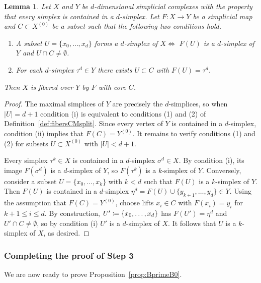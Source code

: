 \documentclass[11 pt]{article}
\theoremstyle{plain}
\newtheorem{lemma}[theorem]{Lemma}
\theoremstyle{definition}
\numberwithin{equation}{section}
\newcommand\coloneq{\mathrel{\mathop:}\mkern-1.2mu=}
\newcommand\abs[1]{\left\lvert#1\right\rvert}
\begin{document}
\begin{lemma}
\label{lemma:fibersonlyd}
Let $X$ and $Y$ be $d$-dimensional simplicial complexes with the property that every simplex is contained in a $d$-simplex. Let $F\colon X\to Y$ be a simplicial map and $C\subset X^{(0)}$ be a subset such that the following two conditions hold.
\begin{enumerate}[label={\normalfont (\roman*)}, topsep=2pt,itemsep=1pt,parsep=1pt]
\item A subset $U=\{x_0,\ldots,x_d\}$ forms a $d$-simplex of $X$\newline  $\iff$ $F(U)$ is a $d$-simplex of $Y$ and $U\cap C\neq \emptyset$.
\item For each $d$-simplex $\tau^d\in Y$ there exists $U\subset C$ with $F(U)=\tau^d$.
\end{enumerate}
Then $X$ is fibered over $Y$ by $F$ with core $C$.
\end{lemma}
\begin{proof}
The maximal simplices of $Y$ are precisely the $d$-simplices, so when $\abs{U}=d+1$ condition (i) is equivalent to conditions (1) and (2) of Definition~\ref{def:fibersCMsplit}. Since every vertex of $Y$ is contained in a $d$-simplex, condition (ii) implies that $F(C)=Y^{(0)}$. It remains to verify conditions (1) and (2) for subsets $U\subset X^{(0)}$ with $\abs{U}<d+1$.

Every simplex $\tau^k\in X$ is contained in a $d$-simplex $\sigma^d\in X$. By condition (i), its image $F(\sigma^d)$ is a $d$-simplex of $Y$, so $F(\tau^k)$ is a $k$-simplex of $Y$. Conversely, consider a subset $U=\{x_0,\ldots,x_k\}$ with $k<d$ such that $F(U)$ is a $k$-simplex of $Y$. Then $F(U)$ is contained in a $d$-simplex $\eta^d=F(U)\cup\{y_{k+1},\ldots,y_d\}\in Y$. Using the assumption that $F(C)=Y^{(0)}$, choose lifts $x_i\in C$ with $F(x_i)=y_i$ for $k+1\leq i\leq d$. By construction, $U'\coloneq\{x_0,\ldots,x_d\}$ has $F(U')=\eta^d$ and $U'\cap C\neq \emptyset$, so by condition (i) $U'$ is a $d$-simplex of $X$. It follows that $U$ is a $k$-simplex of $X$, as desired.
\end{proof}

\subsubsection{Completing the proof of Step 3}
We are now ready to prove Proposition~\ref{prop:BprimeB0}.
\end{document}
